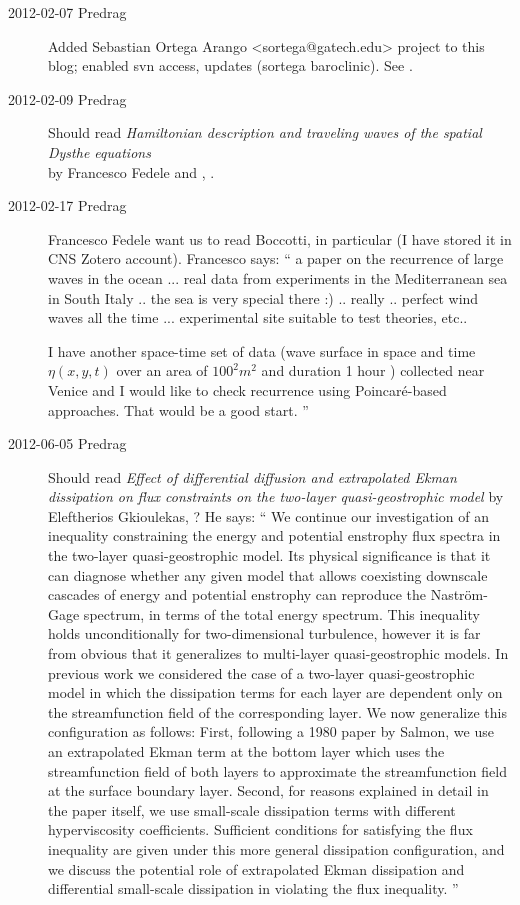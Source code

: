 \begin{description}
\item[2012-02-07 Predrag] Added Sebastian Ortega Arango
<sortega@gatech.edu> project to this blog; enabled svn access, updates
(sortega  baroclinic). See .

\item[2012-02-09 Predrag]
Should read
\emph{Hamiltonian description and traveling waves of the spatial Dysthe
 equations}
 \\
by Francesco Fedele and
,
.

\item[2012-02-17 Predrag]
Francesco Fedele want us to read Boccotti, in particular
 (I have stored it in CNS Zotero account). Francesco says:
``
a paper on the recurrence of large waves in the ocean ... real data
from experiments in the Mediterranean sea in South Italy .. the sea is
very special there :) .. really .. perfect wind waves all the time ...
experimental site suitable to test theories, etc..

I have another space-time set of data (wave surface in space and time
$\eta(x,y,t)$ over an area of $100^2 m^2$ and duration 1 hour ) collected near
Venice and I would like to check recurrence using Poincar\'e-based
approaches. That would be a good start.
''

\item[2012-06-05 Predrag] Should read
\emph{Effect of differential diffusion and extrapolated Ekman dissipation on
 flux constraints on the two-layer quasi-geostrophic model}
by Eleftherios Gkioulekas,
? He says: ``
 We continue our investigation of an inequality constraining the energy and
potential enstrophy flux spectra in the two-layer quasi-geostrophic model. Its
physical significance is that it can diagnose whether any given model that
allows coexisting downscale cascades of energy and potential enstrophy can
reproduce the Nastr\"om-Gage spectrum, in terms of the total energy spectrum.
This inequality holds unconditionally for two-dimensional turbulence, however
it is far from obvious that it generalizes to multi-layer quasi-geostrophic
models. In previous work we considered the case of a two-layer
quasi-geostrophic model in which the dissipation terms for each layer are
dependent only on the streamfunction field of the corresponding layer. We now
generalize this configuration as follows: First, following a 1980 paper by
Salmon, we use an extrapolated Ekman term at the bottom layer which uses the
streamfunction field of both layers to approximate the streamfunction field at
the surface boundary layer. Second, for reasons explained in detail in the
paper itself, we use small-scale dissipation terms with different
hyperviscosity coefficients. Sufficient conditions for satisfying the flux
inequality are given under this more general dissipation configuration, and we
discuss the potential role of extrapolated Ekman dissipation and differential
small-scale dissipation in violating the flux inequality. ''


\end{description}
